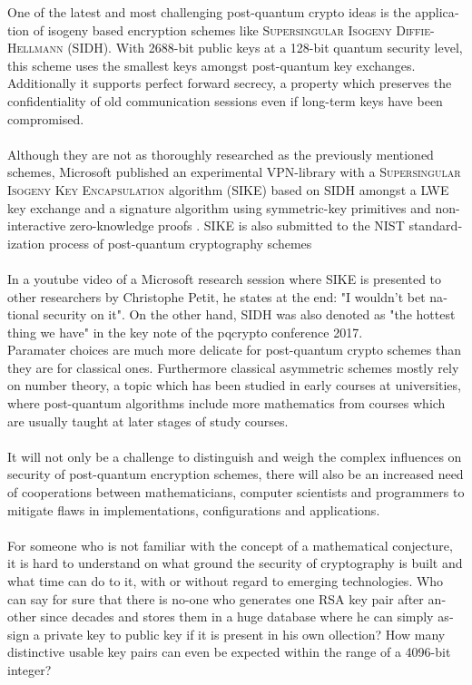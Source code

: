 \documentclass[a4paper,11pt]{article}
\begin{document}
\begin{otherlanguage}{english}
\begin{multicols}{2}
One of the latest and most challenging post-quantum crypto ideas is the application of isogeny based encryption schemes like \textsc{Supersingular Isogeny Diffie-Hellmann} (\textsc{SIDH}). With 2688-bit public keys at a 128-bit quantum security level, this scheme uses the smallest keys amongst post-quantum key exchanges. Additionally it supports perfect forward secrecy, a property which preserves the confidentiality of old communication sessions even if long-term keys have been compromised. \\
\\
Although they are not as thoroughly researched as the previously mentioned schemes, Microsoft published an experimental VPN-library with a \textsc{Supersingular Isogeny Key Encapsulation} algorithm (\textsc{SIKE}) based on \textsc{SIDH} amongst a \textsc{LWE} key exchange and a signature algorithm using symmetric-key primitives and non-interactive zero-knowledge proofs \cite{MSR}. \textsc{SIKE} is also submitted to the NIST standardization process of post-quantum cryptography schemes\\
\\
In a youtube video of a Microsoft research session where \textsc{SIKE} is presented to other researchers by Christophe Petit, he states at the end: "I wouldn't bet national security on it". On the other hand, \textsc{SIDH} was also denoted as "the hottest thing we have" in the key note of the pqcrypto conference 2017. \\

Paramater choices are much more delicate for post-quantum crypto schemes than they are for classical ones. Furthermore classical asymmetric schemes mostly rely on number theory, a topic which has been studied in early courses at universities, where post-quantum algorithms include more mathematics from courses which are usually taught at later stages of study courses. \\
\\
It will not only be a challenge to distinguish and weigh the complex influences on security of post-quantum encryption schemes, there will also be an increased need of cooperations between mathematicians, computer scientists and programmers to mitigate flaws in implementations, configurations and applications. \\
\\
For someone who is not familiar with the concept of a mathematical conjecture, it is hard to understand on what ground the security of cryptography is built and what time can do to it, with or without regard to emerging technologies. Who can say for sure that there is no-one who generates one RSA key pair after another since decades and stores them in a huge database where he can simply assign a private key to public key if it is present in his own ollection? How many distinctive usable key pairs can even be expected within the range of a 4096-bit integer? 


\end{multicols}
\end{otherlanguage}
\end{document}

